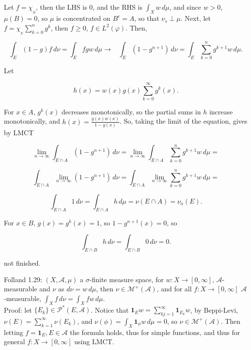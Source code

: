 \documentclass[12pt]{article}
\newcommand{\partset}[1]{ \mathcal{P}^{*}(#1) }
\newcommand{\A}[0] { \mathcal{A} }
\newcommand{\M}[0] { \mathcal{M} }
\newcommand{\rarw}[0] { \rightarrow }
\newcommand{ \cf }[1] { \mathbf{1}_{#1} }
\begin{document}
\noindent

Let $f = \chi_{_B}$, then the LHS is $0$, and the RHS is $\int_X w \, d\mu$, and since $w > 0$, $\mu(B) = 0$, so $\mu$ is concentrated on $B^c = A$, so that $\nu_s \perp \mu$. Next, let $ f = \chi_{_E}  \sum_{k=0}^n g^k$, then $f \ge 0$, $f \in L^2(\varphi)$. Then,

$$
    \int_E (1-g) f \, d\nu = \int_E fgw \, d\mu \rarw \hspace{10pt} \int_E (1-g^{n+1}) \, d\nu = \int_E \sum_{k=0}^n g^{k+1} w \, d\mu.
$$

\noindent Let 

$$
h(x) = w(x)  g(x)\sum_{k=0}^\infty g^{k}(x).
$$

\noindent 
For $x \in A$, $g^k(x)$ decreases monotonically, so the partial sums in $h$ increase monotonically, and $ h(x) = \frac{g(x) w(x)}{1-g(x)}$. So, taking the limit of the equation, gives by LMCT 

$$
\lim_{n \rarw \infty}  \int_{E \cap A} (1-g^{n+1}) \, d\nu =  \lim_{n \rarw \infty}  \int_{E \cap A} \sum_{k=0}^n g^{k+1} w \, d\mu =
$$

$$
\int_{E \cap A}  \lim_{n \rarw \infty}  (1-g^{n+1}) \, d\nu =  \int_{E \cap A} \lim_{n \rarw \infty}   \sum_{k=0}^n g^{k+1} w \, d\mu =
$$

$$
\int_{E \cap A} 1 \, d\nu =  \int_{E \cap A} h \, d\mu = \nu(E \cap A) = \nu_a(E).
$$


\noindent 
For $x \in B$, $g(x) = g^k(x) = 1$, so $1-g^{n+1}(x) = 0$, so

$$
\int_{E \cap B} h \, d\nu = \int_{E \cap B} 0 \, d\nu = 0.
$$

\noindent
not finished.




\break

Folland 1.29: $(X ,\A, \mu)$ a $\sigma$-finite measure space, for $w: X \rarw [0,\infty]$, $\A$-measurable and $\nu$ as $d\nu = w \, d\mu $, then $\nu \in \M^+(\A)$, and for all $f:X \rarw [0, \infty]$ $\A$-measurable, $\int_X f\, d\nu = \int_X fw \, d\mu$. \\

\noindent
Proof: let $\{E_k\} \in \partset{E, \A}$. Notice that $\cf{E} w = \sum_{kj=1}^\infty \cf{E_k} w$, by Beppi-Levi, $\nu(E) = \sum_{k=1}^\infty \nu(E_k)$, and $\nu(\phi) = \int_X \cf{\phi} w \, d\mu = 0$, so $\nu \in \M^+(\A)$. Then letting $f = \cf{E}, E \in \A$ the formula  holds, thus for simple functions, and thus for general $f:X \rarw [0, \infty]$ using LMCT.\\
\end{document}
